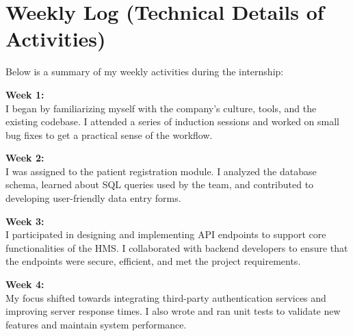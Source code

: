 \section{Weekly Log (Technical Details of Activities)}
Below is a summary of my weekly activities during the internship:

\textbf{Week 1:} \\
I began by familiarizing myself with the company's culture, tools, and the existing codebase. I attended a series of induction sessions and worked on small bug fixes to get a practical sense of the workflow.

\medskip
\textbf{Week 2:} \\
I was assigned to the patient registration module. I analyzed the database schema, learned about SQL queries used by the team, and contributed to developing user-friendly data entry forms.

\medskip
\textbf{Week 3:} \\
I participated in designing and implementing API endpoints to support core functionalities of the HMS. I collaborated with backend developers to ensure that the endpoints were secure, efficient, and met the project requirements.

\medskip
\textbf{Week 4:} \\
My focus shifted towards integrating third-party authentication services and improving server response times. I also wrote and ran unit tests to validate new features and maintain system performance.

\medskip
